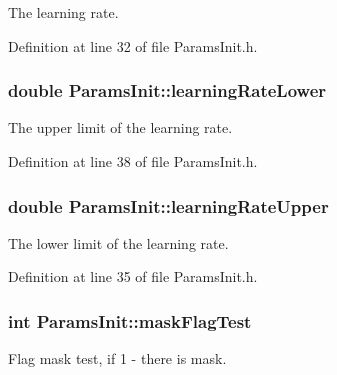 The learning rate. 



Definition at line 32 of file Params\+Init.\+h.

\subsubsection[{\texorpdfstring{learning\+Rate\+Lower}{learningRateLower}}]{\setlength{\rightskip}{0pt plus 5cm}double Params\+Init\+::learning\+Rate\+Lower}\hypertarget{classParamsInit_a5d17698322bd5df72c2040594810e6b0}{}\label{classParamsInit_a5d17698322bd5df72c2040594810e6b0}


The upper limit of the learning rate. 



Definition at line 38 of file Params\+Init.\+h.

\subsubsection[{\texorpdfstring{learning\+Rate\+Upper}{learningRateUpper}}]{\setlength{\rightskip}{0pt plus 5cm}double Params\+Init\+::learning\+Rate\+Upper}\hypertarget{classParamsInit_ae6e008da84ddff1c1114eb2e196f3801}{}\label{classParamsInit_ae6e008da84ddff1c1114eb2e196f3801}


The lower limit of the learning rate. 



Definition at line 35 of file Params\+Init.\+h.

\subsubsection[{\texorpdfstring{mask\+Flag\+Test}{maskFlagTest}}]{\setlength{\rightskip}{0pt plus 5cm}int Params\+Init\+::mask\+Flag\+Test}\hypertarget{classParamsInit_a18bc89c715b973546c7295e11a14a0c0}{}\label{classParamsInit_a18bc89c715b973546c7295e11a14a0c0}


Flag mask test, if 1 -\/ there is mask. 



